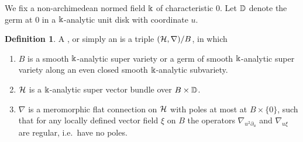 \documentclass[twoside,leqno]{article}
\numberwithin{equation}{section}
\theoremstyle{plain}
\theoremstyle{definition}
\newtheorem{definition}[equation]{Definition}
\begin{document}
We fix a non-archimedean normed field $\Bbbk$ of characteristic $0$. Let $\mathbb D$ denote the germ at $0$ in a $\Bbbk$-analytic unit disk with coordinate $u$. 

\begin{definition} \label{def:F-bundle} 
A , or simply an   is a triple  $(\mathcal H,\nabla)/B$, in which  
\begin{enumerate}[wide]
\item $B$ is a smooth $\Bbbk$-analytic super variety or a germ of smooth $\Bbbk$-analytic super variety along an even closed smooth $\Bbbk$-analytic subvariety.
\item $\mathcal H$ is a $\Bbbk$-analytic super vector bundle  over 
  $B \times \mathbb D$.
\item $\nabla$ is a meromorphic flat connection on $\mathcal H$ with poles at most at $B\times \{0\}$, such that for any locally defined vector field $\xi$ on $B$ the operators 
$\nabla_{u^2\partial_u}$ and $\nabla_{u\xi}$ 
 are regular, i.e.\ have no poles.
\end{enumerate}
\end{definition}
\end{document}
